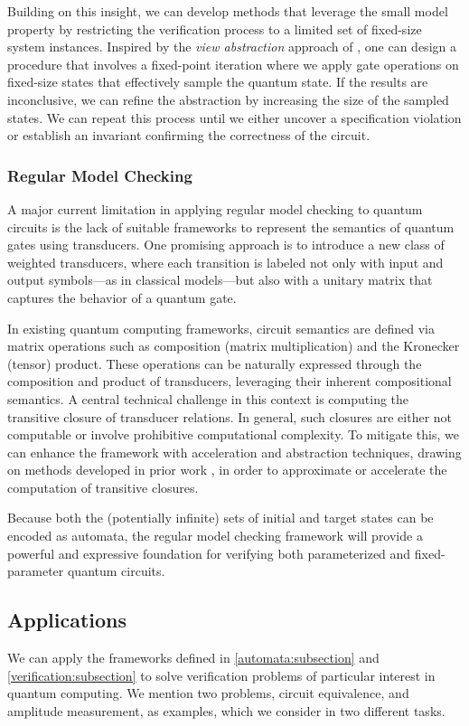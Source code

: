 Building on this insight, we can develop methods that leverage the small model property by restricting the verification process to a limited set of fixed-size system instances.
Inspired by the \emph{view abstraction} approach of \cite{DBLP:journals/sttt/AbdullaHH16}, one can design a procedure that involves a fixed-point iteration where we apply gate operations on fixed-size states that effectively sample the quantum state.
If the results are inconclusive, we can refine the abstraction by increasing the size of the sampled states.
We can repeat this process until we either uncover a specification violation or establish an invariant confirming the correctness of the circuit.

\subsubsection{\textbf{Regular Model Checking}}
A major current limitation in applying regular model checking to quantum circuits is the lack of suitable frameworks to represent the semantics of quantum gates using transducers.
%
One promising approach is to introduce a new class of weighted transducers, where each transition is labeled not only with input and output symbols—as in classical models—but also with a unitary matrix that captures the behavior of a quantum gate.
%

In existing quantum computing frameworks, circuit semantics are defined via matrix operations such as composition (matrix multiplication) and the Kronecker (tensor) product.
%
These operations can be naturally expressed through the composition and product of transducers, leveraging their inherent compositional semantics.
%
A central technical challenge in this context is computing the transitive closure of transducer relations.
%
In general, such closures are either not computable or involve prohibitive computational complexity.
%
To mitigate this, we can enhance the framework with acceleration and abstraction techniques, drawing on methods developed in prior work \cite{DBLP:conf/tacas/AbdullaDHR07}, in order to approximate or accelerate the computation of transitive closures.
%

Because both the (potentially infinite) sets of initial and target states can be encoded as automata, the regular model checking framework will provide a powerful and expressive foundation for verifying both parameterized and fixed-parameter quantum circuits.
%

\subsection{Applications}
We can apply the frameworks defined in \cref{automata:subsection} and \cref{verification:subsection} to solve verification problems of particular interest in quantum computing.
%
We mention two problems, circuit equivalence, and amplitude measurement, as examples, which we consider in two different tasks.

